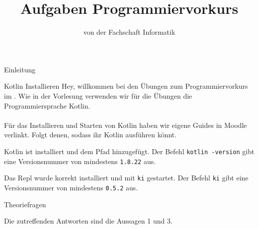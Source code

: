 
\title{Aufgaben Programmiervorkurs}
\subtitle{von der Fachschaft Informatik\hfill\ptitle}

\usepackage{hyperref}
\usepackage{wrapfig}


\maketitle{}

\begin{task}[points=auto]{Einleitung}
    \begin{subtask*}[points=0]{Kotlin Installieren}
        Hey, willkommen bei den Übungen zum Programmiervorkurs im \ptitle. Wie in der
        Vorlesung verwenden wir für die Übungen die Programmiersprache Kotlin. \\\\
        Für das Installieren und Starten von Kotlin haben wir eigene Guides in Moodle verlinkt.
        Folgt denen, sodass ihr Kotlin ausführen könnt.
        \begin{solution}
            Kotlin ist installiert und dem Pfad hinzugefügt. Der Befehl
            \texttt{kotlin -version} gibt eine Versionsnummer von mindestens \texttt{1.8.22} aus.

            Das Repl wurde korrekt installiert und mit \texttt{ki} gestartet. Der Befehl
            \texttt{ki} gibt eine Versionsnummer von mindestens \texttt{0.5.2} aus.
        \end{solution}
    \end{subtask*}
    \begin{subtask*}[points=0]{Theoriefragen}
        \begin{itemize}
            \mchead
        \end{itemize}
        \begin{solution}
            Die zutreffenden Antworten sind die Aussagen 1 und 3.
        \end{solution}
    \end{subtask*}
\end{task}
